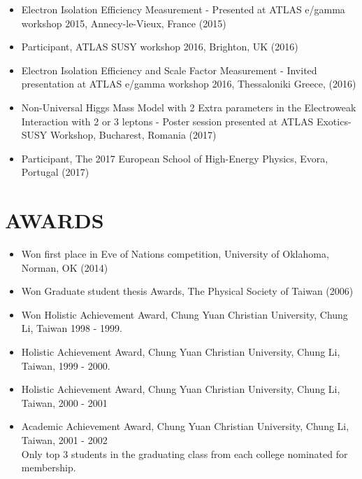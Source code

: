 \documentclass[margin, 10pt]{res} %
\begin{document}
\begin{resume}
\begin{itemize}
    \item Electron Isolation Efficiency Measurement - Presented at ATLAS e/gamma workshop 2015, Annecy-le-Vieux, France (2015)
    \item Participant, ATLAS SUSY workshop 2016, Brighton, UK (2016)
    \item  
Electron Isolation Efficiency and Scale Factor Measurement - Invited presentation at ATLAS e/gamma workshop 2016, Thessaloniki Greece, (2016)
    \item Non-Universal Higgs Mass Model with 2 Extra parameters in the Electroweak Interaction with 2 or 3 leptons - Poster session presented at ATLAS Exotics-SUSY Workshop, Bucharest, Romania (2017)
    \item Participant, The 2017 European 
School of High-Energy Physics, Evora, Portugal (2017)
\end{itemize}


\section{AWARDS}

\begin{itemize}
    \item Won first place in Eve of Nations competition, University of Oklahoma, Norman, OK (2014)
    \item Won Graduate student thesis Awards, The Physical Society of Taiwan (2006)
    \item Won Holistic Achievement Award, Chung Yuan Christian University, Chung Li, Taiwan 1998 - 1999.
    \item Holistic Achievement Award, Chung Yuan Christian University, Chung Li, Taiwan, 1999 - 2000.
    \item Holistic Achievement Award, Chung Yuan Christian University, Chung Li, Taiwan, 2000 - 2001
    \item Academic Achievement Award, Chung Yuan Christian University, Chung Li, Taiwan, 2001 - 2002\\
    Only top 3 students in the graduating class from each college nominated for membership.
\end{itemize}



\end{resume}
\end{document}
